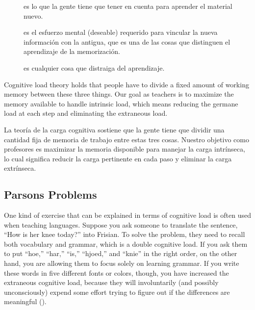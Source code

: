 \begin{description}

\item[]
es lo que la gente tiene que tener en cuenta para aprender el material nuevo.

\item[]
es el esfuerzo mental (deseable) requerido para vincular la nueva información con la antigua, que es una de las cosas que distinguen el aprendizaje de la memorización. 

\item[]
es cualquier cosa que distraiga del aprendizaje.

\end{description}


Cognitive load theory holds that
people have to divide a fixed amount of working memory between these three things.
Our goal as teachers is to maximize the memory available to handle intrinsic load,
which means reducing the germane load at each step and eliminating the extraneous load.

La teoría de la carga cognitiva sostiene que la gente tiene que dividir una cantidad fija de memoria de trabajo entre estas tres cosas. Nuestro objetivo como profesores es maximizar la memoria disponible para manejar la carga intrínseca, lo cual significa reducir la carga pertinente en cada paso y eliminar la carga extrínseca.


\subsection*{Parsons Problems}

One kind of exercise that can be explained in terms of cognitive load
is often used when teaching languages.
Suppose you ask someone to translate the sentence, ``How is her knee today?'' into Frisian.
To solve the problem,
they need to recall both vocabulary and grammar,
which is a double cognitive load.
If you ask them to put ``hoe,'' ``har,'' ``is,'' ``hjoed,'' and ``knie'' in the right order,
on the other hand,
you are allowing them to focus solely on learning grammar.
If you write these words in five different fonts or colors,
though,
you have increased the extraneous cognitive load,
because they will involuntarily (and possibly unconsciously) expend some effort
trying to figure out if the differences are meaningful
().

